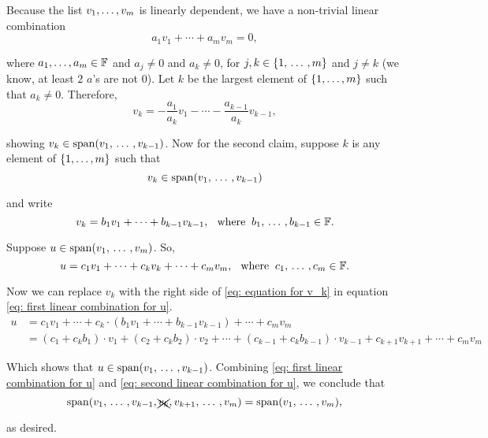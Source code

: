 \begin{prf}
  Because the list $v_1, \dots, v_m$ is linearly dependent, we have a non-trivial linear combination
  \begin{equation}
    a_1 v_1 + \cdots + a_m v_m = 0,
  \end{equation}

  where $a_1, \ldots, a_m \in \mathbb{F}$ and $a_j \neq 0$ and $a_k \neq 0 $, for $j,k \in \{1, {\, \ldots \,\,}, m\}$ and $j \neq k$
  (we know, at least $2$ $a$'s are not $0$). Let $k$ be the largest element of $\{ 1, \ldots, m \}$ such that $a_k \neq 0$. Therefore,
  \begin{equation}
    v_k = - \frac{a_1}{a_k}v_1 - \cdots - \frac{a_{k-1}}{a_k}v_{k-1},
  \end{equation}

  showing $v_k \in \operatorname{span} (v_1, {\, \ldots \,\,}, v_{k-1})$.
  Now for the second claim, suppose $k$ is any element of $\{ 1, \ldots, m \}$ such that
  \begin{equation}
    v_k \in \operatorname{span} (v_1, {\, \ldots \,\,}, v_{k-1})
  \end{equation}

  and write
  \begin{equation}
    \label{eq: equation for v_k}
    v_k = b_1v_1 + \cdots + b_{k-1}v_{k-1}, \;\;\, \text{where}\;\; b_1, {\, \ldots \,\,}, b_{k-1} \in \mathbb{F}.
  \end{equation}

  Suppose $u \in \operatorname{span} (v_1, {\, \ldots \,\,}, v_m)$. So,
  \begin{equation}
    \label{eq: first linear combination for u}
    u = c_1v_1 + \cdots + c_kv_k + \cdots +c_{m}v_{m}, \;\;\, \text{where}\;\; c_1, {\, \ldots \,\,}, c_{m} \in \mathbb{F}.
  \end{equation}

  Now we can replace $v_k$ with the right side of \eqref{eq: equation for v_k} in equation \eqref{eq: first linear combination for u}.
  \begin{equation}
    \begin{aligned}
      \label{eq: second linear combination for u}
      u
      & = c_1v_1 + \cdots + c_k \cdot (b_1v_1 + \cdots + b_{k-1}v_{k-1}) + \cdots +c_{m}v_{m} \\
      & = (c_1 + c_k b_1)\cdot v_1 + (c_2 + c_k b_2) \cdot v_2 + \cdots + (c_{k-1}+c_k b_{k-1}) \cdot v_{k-1} + c_{k+1} v_{k+1} + \cdots + c_m v_m
    \end{aligned}
  \end{equation}

  Which shows that $u \in \operatorname{span} (v_1, {\, \ldots \,\,}, v_{k-1})$. Combining \eqref{eq: first linear combination for u} and \eqref{eq: second linear combination for u}, we conclude that
  \begin{equation}
    \operatorname{span} (v_1, {\, \ldots \,\,}, v_{k-1}, \xcancel{v_k}, v_{k+1}, {\, \ldots \,\,}, v_m) = \operatorname{span} (v_1, {\, \ldots \,\,}, v_m),
  \end{equation}

  as desired.
\end{prf}

